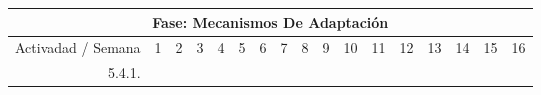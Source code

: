 \documentclass[12pt]{article}
\begin{document}
\begin{table}[H]
{\begin{tabular}{|rllllllllllllllll|}
			\multicolumn{17}{|c|}{\cellcolor[HTML]{D9D9D9}Fase: Mecanismos De Adaptación}                                                                                                                                                                                                                                                                                                                                                                                                                                                                                                                                                                                                                                                                                                                                                                                                             \\ \hline
			\multicolumn{1}{|l|}{\cellcolor[HTML]{D9D9D9}Activadad / Semana}   & \multicolumn{1}{c|}{\cellcolor[HTML]{B6D7A8}1} & \multicolumn{1}{c|}{\cellcolor[HTML]{B6D7A8}2} & \multicolumn{1}{c|}{\cellcolor[HTML]{B6D7A8}3} & \multicolumn{1}{c|}{\cellcolor[HTML]{B6D7A8}4} & \multicolumn{1}{c|}{\cellcolor[HTML]{A4C2F4}5} & \multicolumn{1}{c|}{\cellcolor[HTML]{A4C2F4}6} & \multicolumn{1}{c|}{\cellcolor[HTML]{A4C2F4}7} & \multicolumn{1}{c|}{\cellcolor[HTML]{A4C2F4}8} & \multicolumn{1}{c|}{\cellcolor[HTML]{B4A7D6}9} & \multicolumn{1}{c|}{\cellcolor[HTML]{B4A7D6}10} & \multicolumn{1}{c|}{\cellcolor[HTML]{B4A7D6}11} & \multicolumn{1}{c|}{\cellcolor[HTML]{B4A7D6}12} & \multicolumn{1}{c|}{\cellcolor[HTML]{EA9999}13} & \multicolumn{1}{c|}{\cellcolor[HTML]{EA9999}14} & \multicolumn{1}{c|}{\cellcolor[HTML]{EA9999}15} & \multicolumn{1}{c|}{\cellcolor[HTML]{EA9999}16} \\ \hline
			\multicolumn{1}{|r|}{5.4.1.}                                       & \multicolumn{1}{l|}{}                          & \multicolumn{1}{l|}{}                          & \multicolumn{1}{l|}{}                          & \multicolumn{1}{l|}{}                          & \multicolumn{1}{l|}{}                          & \multicolumn{1}{l|}{}                          & \multicolumn{1}{l|}{}                          & \multicolumn{1}{l|}{}                          & \multicolumn{1}{l|}{}                          & \multicolumn{1}{c|}{\cellcolor[HTML]{B4A7D6}}   & \multicolumn{1}{c|}{\cellcolor[HTML]{B4A7D6}}   & \multicolumn{1}{l|}{}                           & \multicolumn{1}{l|}{}                           & \multicolumn{1}{l|}{}                           & \multicolumn{1}{l|}{}                           &                                                 \\ \hline

\end{tabular}}
\end{table}
\end{document}
